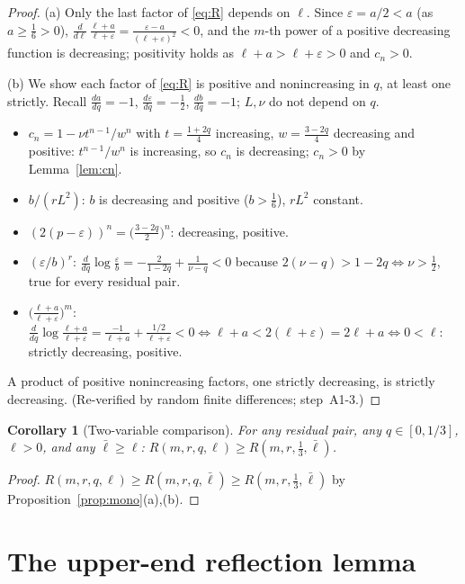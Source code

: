 \documentclass[11pt]{amsart}
\newtheorem{corollary}[theorem]{Corollary}
\theoremstyle{remark}
\newcommand{\lbar}{\bar\ell}
\begin{document}
\begin{proof}
(a) Only the last factor of \eqref{eq:R} depends on $\ell$.  Since $\varepsilon=a/2<a$ (as $a\ge\tfrac16>0$),
$\frac{d}{d\ell}\,\frac{\ell+a}{\ell+\varepsilon}=\frac{\varepsilon-a}{(\ell+\varepsilon)^{2}}<0$,
and the $m$-th power of a positive decreasing function is decreasing; positivity holds as $\ell+a>\ell+\varepsilon>0$ and $c_n>0$.

(b) We show each factor of \eqref{eq:R} is positive and nonincreasing in $q$, at least one strictly.  Recall $\tfrac{da}{dq}=-1$, $\tfrac{d\varepsilon}{dq}=-\tfrac12$, $\tfrac{db}{dq}=-1$; $L,\nu$ do not depend on $q$.
\begin{itemize}
\item $c_n=1-\nu t^{n-1}/w^{n}$ with $t=\frac{1+2q}{4}$ increasing, $w=\frac{3-2q}{4}$ decreasing and positive: $t^{n-1}/w^{n}$ is increasing, so $c_n$ is decreasing; $c_n>0$ by Lemma~\ref{lem:cn}.
\item $b/(rL^{2})$: $b$ is decreasing and positive ($b>\tfrac16$), $rL^{2}$ constant.
\item $(2(p-\varepsilon))^{n}=\bigl(\tfrac{3-2q}{2}\bigr)^{n}$: decreasing, positive.
\item $(\varepsilon/b)^{r}$: $\frac{d}{dq}\log\frac{\varepsilon}{b}=-\frac{2}{1-2q}+\frac{1}{\nu-q}<0$ because $2(\nu-q)>1-2q\iff\nu>\tfrac12$, true for every residual pair.
\item $\bigl(\frac{\ell+a}{\ell+\varepsilon}\bigr)^{m}$:
$\frac{d}{dq}\log\frac{\ell+a}{\ell+\varepsilon}
=\frac{-1}{\ell+a}+\frac{1/2}{\ell+\varepsilon}<0
\iff\ell+a<2(\ell+\varepsilon)=2\ell+a\iff0<\ell$: strictly decreasing, positive.
\end{itemize}
A product of positive nonincreasing factors, one strictly decreasing, is strictly decreasing.  (Re-verified by random finite differences; step~A1-3.)
\end{proof}

\begin{corollary}[Two-variable comparison]\label{cor:twovar}
For any residual pair, any $q\in[0,1/3]$, $\ell>0$, and any $\lbar\ge\ell$:
$R(m,r,q,\ell)\ge R(m,r,\tfrac13,\lbar)$.
\end{corollary}

\begin{proof}
$R(m,r,q,\ell)\ge R(m,r,q,\lbar)\ge R(m,r,\tfrac13,\lbar)$ by Proposition~\ref{prop:mono}(a),(b).
\end{proof}

\section{The upper-end reflection lemma}\label{sec:reflection}
\end{document}

